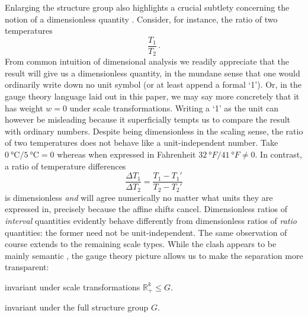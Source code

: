\documentclass[12pt]{article}
\numberwithin{equation}{section}
\begin{document}
Enlarging the structure group also highlights a crucial subtlety concerning the notion of a dimensionless quantity \citep{Emerson2005, Hall2022}. Consider, for instance, the ratio of two temperatures
\begin{equation}
    \frac{T_1}{T_2}\,.
\end{equation}
From common intuition of dimensional analysis we readily appreciate that the result will give us a dimensionless quantity, in the mundane sense that one would ordinarily write down no unit symbol (or at least append a formal `1'). Or, in the gauge theory language laid out in this paper, we may say more concretely that it has weight $w=0$ under scale transformations. Writing a `1' as the unit can however be misleading because it superficially tempts us to compare the result with ordinary numbers. Despite being dimensionless in the scaling sense, the ratio of two temperatures does not behave like a unit-independent number. Take $\SI{0}{\celsius}/\SI{5}{\celsius} = 0$ whereas when expressed in Fahrenheit $\SI{32}{\degree F}/\SI{41}{\degree F} \neq 0$. In contrast, a ratio of temperature differences
\begin{equation}
    \frac{\Delta T_1}{\Delta T_2} = \frac{T_1 - T_1'}{T_2-T_2'}
\end{equation}
is dimensionless \emph{and} will agree numerically no matter what units they are expressed in, precisely because the affine shifts cancel. Dimensionless ratios of \emph{interval} quantities evidently behave differently from dimensionless ratios of \emph{ratio} quantities: the former need not be unit-independent. The same observation of course extends to the remaining scale types. While the clash appears to be mainly semantic \citep{Hall2022}, the gauge theory picture allows us to make the separation more transparent:

\vspace{0.25cm}
\begin{description}[font=\textsf,labelindent=1cm]
    \item[Dimensionless:] invariant under scale transformations $\mathbb{R}_+^k\leq G$.
    \item[Unit-independent:] invariant under the full structure group $G$.
\end{description}
\vspace{0.25cm}
\end{document}
